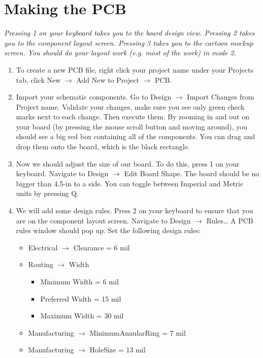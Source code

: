 \documentclass[12pt]{article}
\begin{document}
    \section*{Making the PCB}
    \textit{Pressing 1 on your keyboard takes you to the board design view. Pressing 2 takes you to the component layout screen. Pressing 3 takes you to the cartoon mockup screen. You should do your layout work (e.g. most of the work) in mode 2.}
    
    \begin{enumerate}
    \item To create a new PCB file, right click your project name under your Projects tab, click New $\rightarrow$ Add New to Project $\rightarrow$ PCB.
    \item Import your schematic components. Go to Design $\rightarrow$ Import Changes from Project name. Validate your changes, make sure you see only green check marks next to each change. Then execute them. By zooming in and out on your board (by pressing the mouse scroll button and moving around), you should see a big red box containing all of the components. You can drag and drop them onto the board, which is the black rectangle.
    
    \item Now we should adjust the size of our board. To do this, press 1 on your keyboard. Navigate to Design $\rightarrow$ Edit Board Shape. The board should be no bigger than 4.5-in to a side. You can toggle between Imperial and Metric units by pressing Q.
    
    \item We will add some design rules. Press 2 on your keyboard to ensure that you are on the component layout screen. Navigate to Design $\rightarrow$ Rules\dots
A PCB rules window should pop up. Set the following design rules:

    \begin{itemize}
    \item Electrical $\rightarrow$ Clearance = 6 mil 
    \item Routing $\rightarrow$ Width
        \begin{itemize}
            \item Minimum Width = 6 mil
            \item Preferred Width = 15 mil
            \item Maximum Width = 30 mil
        \end{itemize}
    \item Manufacturing $\rightarrow$ MinimumAnnularRing = 7 mil
    \item Manufacturing $\rightarrow$ HoleSize = 13 mil
    \end{itemize}
    

\end{enumerate}
\end{document}
